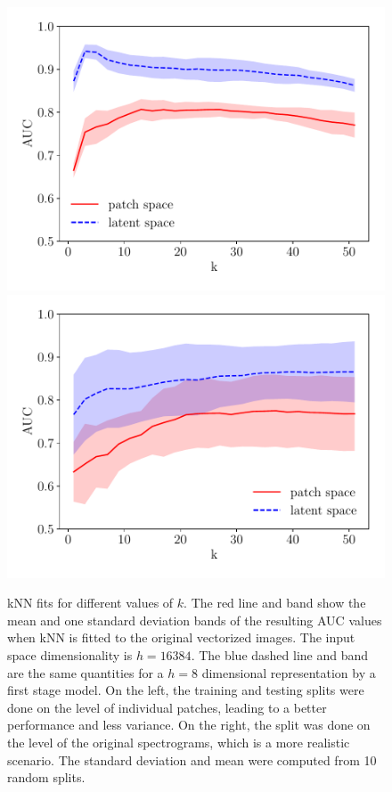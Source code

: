 \begin{figure}
\centering
\includegraphics[scale=0.45]{data/chapter_alfven/split_patches.pdf}
\includegraphics[scale=0.45]{data/chapter_alfven/split_spectrograms.pdf}
\caption{kNN fits for different values of $k$. The red line and band show the mean and one standard deviation bands of the resulting AUC values when kNN is fitted to the original vectorized images. The input space dimensionality is $h=16384$. The blue dashed line and band are the same quantities for a $h=8$ dimensional representation by a first stage model. On the left, the training and testing splits were done on the level of individual patches, leading to a better performance and less variance. On the right, the split was done on the level of the original spectrograms, which is a more realistic scenario. The standard deviation and mean were computed from 10 random splits.}
\label{fig:patches_latent}
\end{figure}

